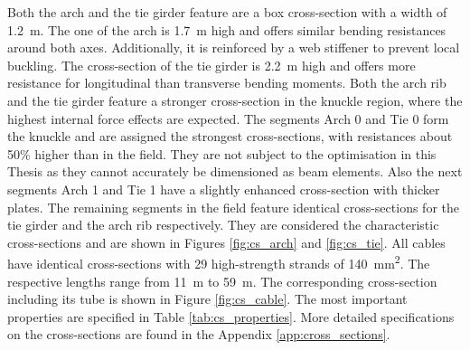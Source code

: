 Both the arch and the tie girder feature are a box cross-section with a width of \SI{1.2}{m}. The one of the arch is \SI{1.7}{m} high and offers similar bending resistances around both axes. Additionally, it is reinforced by a web stiffener to prevent local buckling. The cross-section of the tie girder is \SI{2.2}{m} high and offers more resistance for longitudinal than transverse bending moments. Both the arch rib and the tie girder feature a stronger cross-section in the knuckle region, where the highest internal force effects are expected. The segments Arch 0 and Tie 0 form the knuckle and are assigned the strongest cross-sections, with resistances about 50\% higher than in the field. They are not subject to the optimisation in this Thesis as they cannot accurately be dimensioned as beam elements. Also the next segments Arch 1 and Tie 1 have a slightly enhanced cross-section with thicker plates. The remaining segments in the field feature identical cross-sections for the tie girder and the arch rib respectively. They are considered the characteristic cross-sections and are shown in Figures \ref{fig:cs_arch} and \ref{fig:cs_tie}. All cables have identical cross-sections with 29 high-strength strands of \SI{140}{mm^2}. The respective lengths range from \SI{11}{m} to \SI{59}{m}. The corresponding cross-section including its tube is shown in Figure \ref{fig:cs_cable}. The most important properties are specified in Table \ref{tab:cs_properties}. More detailed specifications on the cross-sections are found in the Appendix \ref{app:cross_sections}.

